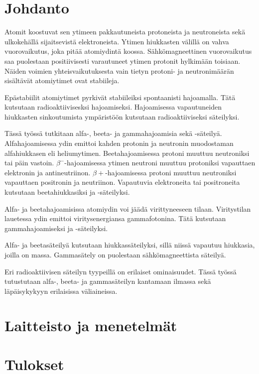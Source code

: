 \documentclass[a4paper,11pt]{article}
\begin{document}
\section{Johdanto}

Atomit koostuvat sen ytimeen pakkautuneista protoneista ja neutroneista sekä ulkokehällä sijaitsevistä elektroneista. Ytimen hiukkasten välillä on vahva vuorovaikutus, joka pitää atomiydintä koossa. Sähkömagneettinen vuorovaikutus saa puolestaan positiivisesti varautuneet ytimen protonit hylkimään toisiaan. Näiden voimien yhteisvaikutuksesta vain tietyn protoni- ja neutronimäärän sisältävät atomiytimet ovat stabiileja. 

Epästabiilit atomiytimet pyrkivät stabiileiksi spontaanisti hajoamalla. Tätä kutsutaan radioaktiivisesksi hajoamiseksi. Hajoamisessa vapautuneiden hiukkasten sinkoutumista ympäristöön kutsutaan radioaktiiviseksi säteilyksi. 

Tässä työssä tutkitaan alfa-, beeta- ja gammahajoamisia sekä -säteilyä. Alfahajoamisessa ydin emittoi kahden protonin ja neutronin muodostaman alfahiukkasen eli heliumytimen. Beetahajoamisessa protoni muuttuu neutroniksi tai päin vastoin. $\beta^-$-hajoamisessa ytimen neutroni muuttuu protoniksi vapauttaen elektronin ja antineutriinon. $\beta+$-hajoamisessa protoni muuttuu neutroniksi vapauttaen positronin ja neutriinon. Vapautuvia elektroneita tai positroneita kutsutaan beetahiukkasiksi ja -säteilyksi. 

Alfa- ja beetahajoamisissa atomiydin voi jäädä virittyneeseen tilaan. Viritystilan lauetessa ydin emittoi viritysenergiansa gammafotonina. Tätä kutsutaan gammahajoamiseksi ja -säteilyksi. 

Alfa- ja beetasäteilyä kutsutaan hiukkassäteilyksi, sillä niissä vapautuu hiukkasia, joilla on massa. Gammasätely on puolestaan sähkömagneettista säteilyä. 

Eri radioaktiivisen säteilyn tyypeillä on erilaiset ominaisuudet. Tässä työssä tutustutaan alfa-, beeta- ja gammasäteilyn kantamaan ilmassa sekä läpäisykykyyn erilaisissa väliaineissa. 

\section{Laitteisto ja menetelmät}

\section{Tulokset}
\end{document}
